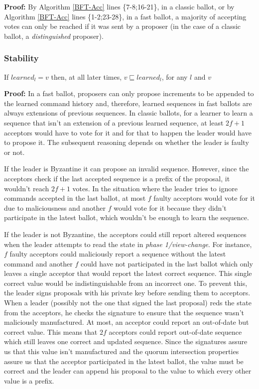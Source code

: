 \textbf{Proof:} By Algorithm \ref{BFT-Acc} lines \{7-8;16-21\}, in a classic ballot, or by Algorithm \ref{BFT-Acc} lines \{1-2;23-28\}, in a fast ballot, a majority of accepting votes can only be reached if it was sent by a proposer (in the case of a classic ballot, a \textit{distinguished} proposer).

\subsubsection{Stability}
\begin{theorem}
If $learned_l = v$ then, at all later times, $v \sqsubseteq learned_l$, for any $l$ and $v$ \par \label{S-T1}
\end{theorem} 
\textbf{Proof:} In a fast ballot, proposers can only propose increments to be appended to the learned command history and, therefore, learned sequences in fast ballots are always extensions of previous sequences. In classic ballots, for a learner to learn a sequence that isn't an extension of a previous learned sequence, at least $2f+1$ acceptors would have to vote for it and for that to happen the leader would have to propose it. The subsequent reasoning depends on whether the leader is faulty or not.\par
If the leader is Byzantine it can propose an invalid sequence. However, since the acceptors check if the last accepted sequence is a prefix of the proposal, it wouldn't reach $2f+1$ votes. In the situation where the leader tries to ignore commands accepted in the last ballot, at most $f$ faulty acceptors would vote for it due to maliciousness and another $f$ would vote for it because they didn't participate in the latest ballot, which wouldn't be enough to learn the sequence. \par
If the leader is not Byzantine, the acceptors could still report altered sequences when the leader attempts to read the state in \textit{phase 1/view-change}. For instance, $f$ faulty acceptors could maliciously report a sequence without the latest command and another $f$ could have not participated in the last ballot which only leaves a single acceptor that would report the latest correct sequence. This single correct value would be indistinguishable from an incorrect one. To prevent this, the leader signs proposals with his private key before sending them to acceptors. When a leader (possibly not the one that signed the last proposal) reds the state from the acceptors, he checks the signature to ensure that the sequence wasn't maliciously manufactured. At most, an acceptor could report an out-of-date but correct value. This means that $2f$ acceptors could report out-of-date sequence which still leaves one correct and updated sequence. Since the signatures assure us that this value isn't manufactured and the quorum intersection properties assure us that the acceptor participated in the latest ballot, the value must be correct and the leader can append his proposal to the value to which every other value is a prefix.